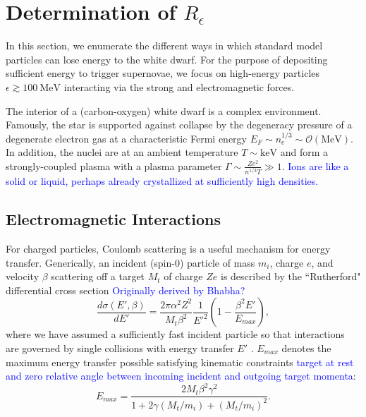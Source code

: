 \documentclass[twocolumn,showpacs,preprintnumbers,amsmath,amssymb,prl]{revtex4}
\newcommand{\OO}{\mathcal{O}}
\def\r{\right)}
\def\l{\left(}
\begin{document}
\section{Determination of $R_\epsilon$}
In this section, we enumerate the different ways in which standard model particles can lose energy to the white dwarf. For the purpose of depositing sufficient energy to trigger supernovae, we focus on high-energy particles $\epsilon \gtrsim 100 ~\text{MeV}$ interacting via the strong and electromagnetic forces. 

The interior of a (carbon-oxygen) white dwarf is a complex environment. Famously, the star is supported against collapse by the degeneracy pressure of a degenerate electron gas at a characteristic Fermi energy $E_F \sim n_e^{1/3} \sim \OO(\text{MeV})$. In addition, the nuclei are at an ambient temperature $T \sim \text{keV}$ and form a strongly-coupled plasma with a plasma parameter $\Gamma \sim \frac{Z e^2}{n^{1/3} T} \gg 1$. \textcolor{blue}{Ions are like a solid or liquid, perhaps already crystallized at sufficiently high densities.}

\subsection{Electromagnetic Interactions}

For charged particles, Coulomb scattering is a useful mechanism for energy transfer. Generically, an incident (spin-0) particle of mass $m_i$, charge $e$, and velocity $\beta$ scattering off a target $M_t$ of charge $Ze$ is described by the ``Rutherford" differential cross section \textcolor{blue}{Originally derived by Bhabha?}
\begin{equation}
\label{eq:rutherford}
\frac{d \sigma (E', \beta)}{dE'} = \frac{2 \pi  \alpha^2 Z^2}{M_t \beta^2} \frac{1}{E'^2} \l1- \frac{\beta^2 E'}{E_{max}}\r, 
 \end{equation}
where we have assumed a sufficiently fast incident particle so that interactions are governed by single collisions with energy transfer $E'$ \cite{PDG}. $E_{max}$ denotes the maximum energy transfer possible satisfying kinematic constraints \textcolor{blue}{target at rest and zero relative angle between incoming incident and outgoing target momenta}:
\begin{equation}
E_{max} = \frac{2 M_t \beta^2 \gamma^2}{1+ 2\gamma(M_t/m_i) +(M_t/m_i)^2}. 
\end{equation}
\end{document}
